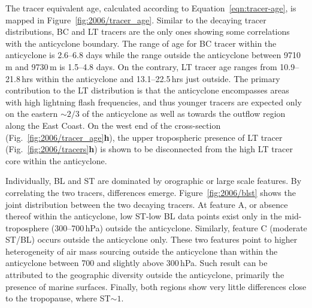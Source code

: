 The tracer equivalent age, calculated according to Equation~\ref{eqn:tracer-age}, is mapped in Figure~\ref{fig:2006/tracer_age}.
Similar to the decaying tracer distributions, BC and LT tracers are the only ones showing some correlations with the anticyclone boundary.
The range of age for BC tracer within the anticyclone is 2.6--6.8 days while the range outside the anticyclone between 9710\,\unit{m} and
9730\,\unit{m} is 1.5--4.8 days. On the contrary, LT tracer age ranges from 10.9--21.8\,\unit{hrs} within the anticyclone and 13.1--22.5\,\unit{hrs}
just outside. The primary contribution to the LT distribution is that the anticyclone encompasses areas with high lightning flash frequencies,
and thus younger tracers are expected only on the eastern $\sim2/3$ of the anticyclone as well as towards the outflow region along
the East Coast. On the west end of the cross-section (Fig.~\ref{fig:2006/tracer_age}{\bf h}), the upper tropospheric presence of LT tracer
(Fig.~\ref{fig:2006/tracers}{\bf h}) is shown to be disconnected from the high LT tracer core within the anticyclone.


Individually, BL and ST are dominated by orographic or large scale features. By correlating the two tracers, differences emerge.
Figure~\ref{fig:2006/blst} shows the joint distribution between the two decaying tracers. At feature A, or absence thereof within the
anticyclone, low ST-low BL data points exist only in the mid-troposphere (300--700\,\unit{hPa}) outside the anticyclone. Similarly,
feature C (moderate ST/BL) occurs outside the anticyclone only. These two features point to higher heterogeneity of air mass sourcing
outside the anticyclone than within the anticyclone between 700 and slightly above 300\,\unit{hPa}. Such result can be attributed to
the geographic diversity outside the anticyclone, primarily the presence of marine surfaces. Finally, both regions show very little
differences close to the tropopause, where ST$\sim1$.

